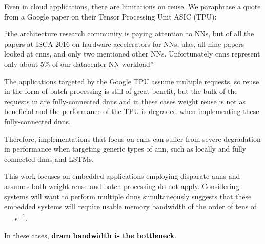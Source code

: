 \iffalse
There important application is disparate \ac{ann}s because specifically a form of \ac{dnn}, Convolutional Neural networks (\ac{cnn}) have gotten good press recently, but they are not the only \ac{dnn}.
\fi

Even in cloud applications, there are limitations on reuse. We paraphrase a quote from a Google paper \cite{tensorflow2015-whitepaper} on their Tensor Processing Unit ASIC (TPU):

\hyphenquote{american}{the architecture research community is paying attention to NNs, but of all the papers at ISCA 2016 on hardware accelerators for NNs, alas, all nine papers looked at \ac{cnn}s, and only two mentioned other NNs. Unfortunately \ac{cnn}s represent only about 5\% of our datacenter NN workload}

The applications targeted by the Google TPU \cite{tensorflow2015-whitepaper} assume multiple requests, so reuse in the form of batch processing is still of great benefit, but the bulk of the requests in \cite{tensorflow2015-whitepaper} are fully-connected \ac{dnn}s and in these cases weight reuse is not as beneficial and the performance of the TPU is degraded when implementing these fully-connected \ac{dnn}s.

Therefore, implementations that focus on \ac{cnn}s can suffer from severe degradation in performance when targeting generic types of \ac{ann}, such as locally and fully connected \ac{dnn}s and LSTMs.

This work focuses on embedded applications employing disparate \ac{ann}s and assumes both weight reuse and batch processing do not apply.
Considering systems will want to perform multiple \ac{dnn}s simultaneously suggests that these embedded systems will require usable memory bandwidth of the order of tens of \SI[per-mode=symbol]{}{\tera \bit \per \second}.

In these cases, \textbf{\textcolor{black}{\ac{dram} bandwidth is the bottleneck}}.
\fi


\iffalse

\iffalse
So considering the performance improvements observed in other applications, it is expected that many customer facing or embedded applications will implement multiple instances of artificial neural networks to perform various functions.
have very large memory and processing requirements.
require multiple instances of \ac{ann}s of similar size to the \ac{ann} described in \cite{krizhevsky2012imagenet}.

For example employing multiple cameras or monitoring and controlling different systems in a drone, a automobile each with an image recognition \ac{ann}\cite{krizhevsky2012imagenet}\cite{bojarski2016end} for navigation, engine monitoring along with other system control.
\fi

